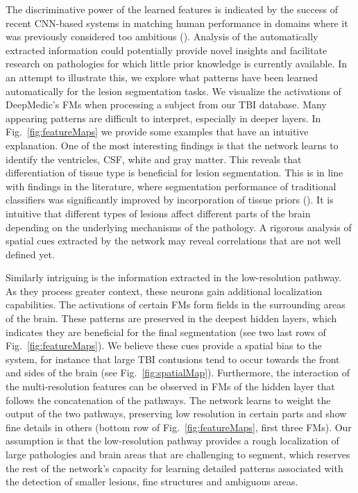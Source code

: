 \documentclass[preprint,authoryear,12pt]{elsarticle}
\begin{document}
The discriminative power of the learned features is indicated by the success of recent CNN-based systems in matching human performance in domains where it was previously considered too ambitious (\cite{he2015delving, Silver2016}). Analysis of the automatically extracted information could potentially provide novel insights and facilitate research on pathologies for which little prior knowledge is currently available. In an attempt to illustrate this, we explore what patterns have been learned automatically for the lesion segmentation tasks. We visualize the activations of DeepMedic's FMs when processing a subject from our TBI database. Many appearing patterns are difficult to interpret, especially in deeper layers. In Fig.~\ref{fig:featureMaps} we provide some examples that have an intuitive explanation. One of the most interesting findings is that the network learns to identify the ventricles, CSF, white and gray matter. This reveals that differentiation of tissue type is beneficial for lesion segmentation. This is in line with findings in the literature, where segmentation performance of traditional classifiers was significantly improved by incorporation of tissue priors (\cite{Leemput1999, Zikic2012}). It is intuitive that different types of lesions affect different parts of the brain depending on the underlying mechanisms of the pathology. A rigorous analysis of spatial cues extracted by the network may reveal correlations that are not well defined yet.

Similarly intriguing is the information extracted in the low-resolution pathway. As they process greater context, these neurons gain additional localization capabilities. The activations of certain FMs form fields in the surrounding areas of the brain. These patterns are preserved in the deepest hidden layers, which indicates they are beneficial for the final segmentation (see two last rows of Fig.~\ref{fig:featureMaps}). We believe these cues provide a spatial bias to the system, for instance that large TBI contusions tend to occur towards the front and sides of the brain (see Fig.~\ref{fig:spatialMap}). Furthermore, the interaction of the multi-resolution features can be observed in FMs of the hidden layer that follows the concatenation of the pathways. The network learns to weight the output of the two pathways, preserving low resolution in certain parts and show fine details in others (bottom row of Fig.~\ref{fig:featureMaps}, first three FMs). Our assumption is that the low-resolution pathway provides a rough localization of large pathologies and brain areas that are challenging to segment, which reserves the rest of the network's capacity for learning detailed patterns associated with the detection of smaller lesions, fine structures and ambiguous areas.
\end{document}
